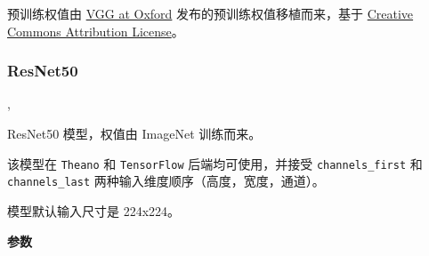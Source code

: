 预训练权值由
\href{http://www.robots.ox.ac.uk/~vgg/research/very_deep/}{VGG at
Oxford} 发布的预训练权值移植而来，基于
\href{https://creativecommons.org/licenses/by/4.0/}{Creative Commons
Attribution License}。



\subsubsection{ResNet50}\label{resnet50}

\begin{Shaded}
\begin{Highlighting}[]
\OperatorTok{=}\OperatorTok{=}, \\
\hspace{3cm}\OperatorTok{=}\OperatorTok{=}\OperatorTok{=}\OperatorTok{=}\NormalTok{)}
\end{Highlighting}
\end{Shaded}

ResNet50 模型，权值由 ImageNet 训练而来。

该模型在 \texttt{Theano} 和 \texttt{TensorFlow} 后端均可使用，并接受
\texttt{channels\_first} 和 \texttt{channels\_last}
两种输入维度顺序（高度，宽度，通道）。

模型默认输入尺寸是 224x224。

\textbf{参数}\label{ux53c2ux6570-3}

